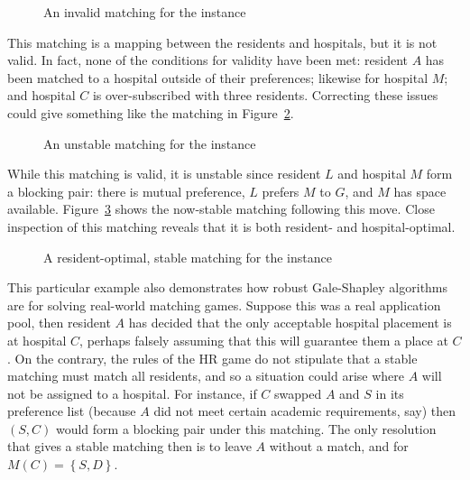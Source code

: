 \begin{figure}[htbp]
    \centering
    
    \caption{An invalid matching for the instance}\label{fig:hr_invalid}
\end{figure}

This matching is a mapping between the residents and hospitals, but it is not
valid. In fact, none of the conditions for validity have been met: resident
\(A\) has been matched to a hospital outside of their preferences; likewise for
hospital \(M\); and hospital \(C\) is over-subscribed with three residents.
Correcting these issues could give something like the matching in
Figure~\ref{fig:hr_unstable}.

\begin{figure}[htbp]
    \centering
    
    \caption{An unstable matching for the instance}\label{fig:hr_unstable}
\end{figure}

While this matching is valid, it is unstable since resident \(L\) and hospital
\(M\) form a blocking pair: there is mutual preference, \(L\) prefers \(M\) to
\(G\), and \(M\) has space available. Figure~\ref{fig:hr_stable} shows the
now-stable matching following this move. Close inspection of this matching
reveals that it is both resident- and hospital-optimal.

\begin{figure}[htbp]
    \centering
    
    \caption{%
        A resident-optimal, stable matching for the instance
    }\label{fig:hr_stable}
\end{figure}

This particular example also demonstrates how robust Gale-Shapley algorithms are
for solving real-world matching games. Suppose this was a real application pool,
then resident \(A\) has decided that the only acceptable hospital placement is
at hospital \(C\), perhaps falsely assuming that this will guarantee them a
place at \(C\). On the contrary, the rules of the HR game do not stipulate that
a stable matching must match all residents, and so a situation could arise where
\(A\) will not be assigned to a hospital. For instance, if \(C\) swapped \(A\)
and \(S\) in its preference list (because \(A\) did not meet certain academic
requirements, say) then \((S, C)\) would form a blocking pair under this
matching. The only resolution that gives a stable matching then is to leave
\(A\) without a match, and for \(M(C) = \left\{S, D\right\}\).

